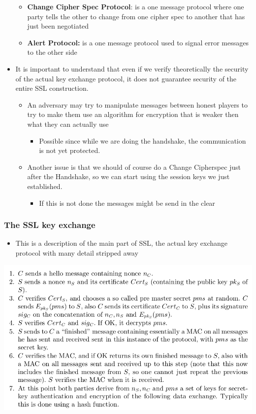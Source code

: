 \documentclass[11pt]{article}
\begin{document}
\begin{itemize}
\begin{itemize}
\item \textbf{Change Cipher Spec Protocol}: is a one message protocol where one party tells the other to change from one cipher spec to another that has just been negotiated

\item \textbf{Alert Protocol:} is a one message protocol used to signal error messages to the other side
\end{itemize}

\item It is important to understand that even if we verify theoretically the security of the actual key exchange protocol, it does not guarantee security of the entire SSL construction.
\begin{itemize}
\item An adversary may try to manipulate messages between honest players to try to make them use an algorithm for encryption that is weaker then what they can actually use
\begin{itemize}
\item Possible since while we are doing the handshake, the communication is not yet protected.
\end{itemize}
\item Another issue is that we should of course do a Change Cipherspec just after the Handshake, so we can start using the session keys we just established.
\begin{itemize}
\item If this is not done the messages might be send in the clear
\end{itemize}
\end{itemize}
\end{itemize}
\subsubsection{The SSL key exchange}
\label{sec:org8d38cb6}

\begin{itemize}
\item This is a description of the main part of SSL, the actual key exchange protocol with many detail stripped away
\end{itemize}
\begin{center}
\includegraphics[width=.9\linewidth]{Network Security Mechanisms (12)/screenshot_2018-11-11_20-07-08.png}
\end{center}
\end{document}
